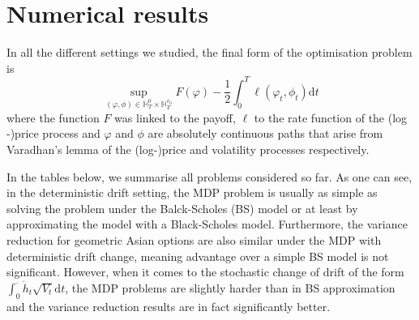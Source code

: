 \documentclass{amsart}[11pt]
\numberwithin{equation}{section}
\numberwithin{theorem}{subsection}
\numberwithin{proposition}{subsection}
\numberwithin{definition}{subsection}
\numberwithin{lemma}{subsection}
\numberwithin{assumption}{subsection}
\newcommand{\HH}{\mathbb{H}}
\newcommand{\D}{\mathrm{d}}
\begin{document}
\section{Numerical results}\label{sec:Num_results}
In all the different settings we studied, the final form of the optimisation problem is
\[\sup_{(\varphi, \phi)\in \HH_T^0\times \HH_T^{v_0}}F(\varphi) - \frac{1}{2}\int_0^T\ell(\varphi_t,\phi_t)\D t\]
where the function $F$ was linked to the payoff, $\ell$ to the rate function of the (log\nobreakdash
-)price process and $\varphi$ and $\phi$ are absolutely continuous paths that arise from Varadhan's lemma of the (log\nobreakdash-)price and volatility processes respectively.

In the tables below, we summarise all problems considered so far. As one can see, in the deterministic drift setting, the MDP problem is usually as simple as solving the problem under the Balck-Scholes (BS) model or at least by approximating the model with a Black-Scholes model. Furthermore, the variance reduction for geometric Asian options are also similar under the MDP with deterministic drift change, meaning advantage over a simple BS model is not significant. However, when it comes to the stochastic change of drift of the form $\int_{0}^{\cdot}\dot{h}_t\sqrt{V_t}\D t$, the MDP problems are slightly harder than in BS approximation and the variance reduction results are in fact significantly better.
\end{document}
